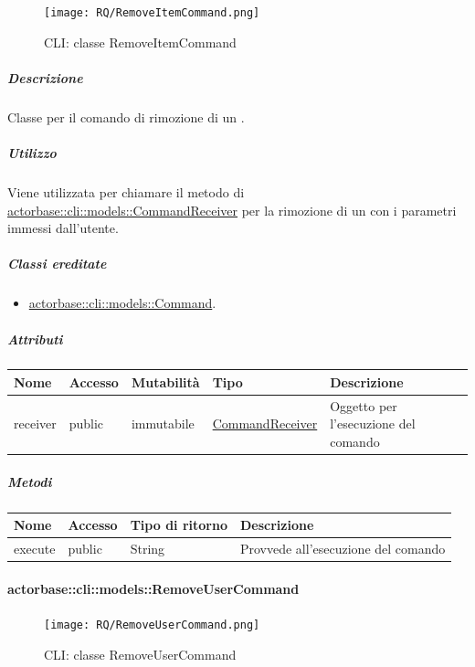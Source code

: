\documentclass{scalatekids-article}
\begin{document}
\begin{figure}[H]
  \begin{center}
    \texttt{[image: RQ/RemoveItemCommand.png]}
    \caption{CLI: classe RemoveItemCommand}
  \end{center}
\end{figure}

\subparagraph{Descrizione}

Classe per il comando di rimozione di un .

\subparagraph{Utilizzo}

Viene utilizzata per chiamare il metodo di
\hyperref[sec:actorbase::cli::models::CommandReceiver]{actorbase::cli::models::CommandReceiver} per la rimozione di un 
con i parametri immessi dall'utente.

\subparagraph{Classi ereditate}

\begin{itemize}
\item \hyperref[sec:actorbase::cli::models::Command]{actorbase::cli::models::Command}.
\end{itemize}

\subparagraph{Attributi}

\begin{tabular}{| p{1cm} | p{1.5cm} | p{2cm} | p{4cm} | p{8.5cm} |}
  \hline
  Nome & Accesso & Mutabilità & Tipo & Descrizione\\
  \hline
  receiver & public & immutabile & \hyperref[sec:actorbase::cli::models::CommandReceiver]{CommandReceiver} & Oggetto per l'esecuzione del comando\\
  \hline
\end{tabular}

\subparagraph{Metodi}

\begin{tabular}{| l | l | l | l |}
  \hline
  Nome & Accesso & Tipo di ritorno & Descrizione\\
  \hline
  execute & public & String & Provvede all'esecuzione del comando\\
  \hline
\end{tabular}

\paragraph{actorbase::cli::models::RemoveUserCommand}
\label{sec:actorbase::cli::models::RemoveUserCommand}

\begin{figure}[H]
  \begin{center}
    \texttt{[image: RQ/RemoveUserCommand.png]}
    \caption{CLI: classe RemoveUserCommand}
  \end{center}
\end{figure}
\end{document}
